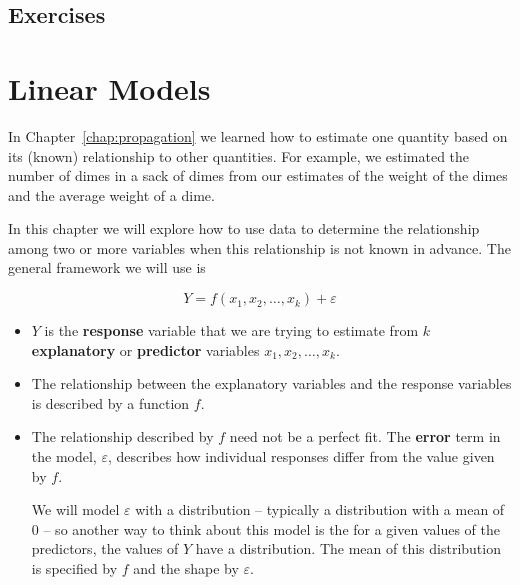 \documentclass[twoside]{book}\usepackage[]{graphicx}\usepackage[]{xcolor}
\def\term#1{\textbf{#1}}
\newcounter{example}[section]
\newif\ifsolutions
\newif\ifsolutionslocal
\begin{document}
\newpage
\section{Exercises}
\shipoutProblems

\ifsolutions
\ifsolutionslocal
\newpage
\section*{Solutions}
\shipoutSolutions
\fi
\fi






\setcounter{chapter}{6}

\chapter{Linear Models}

In Chapter~\ref{chap:propagation} we learned how to estimate one quantity based
on its (known) relationship to other quantities.  For example, we estimated the
number of dimes in a sack of dimes from our estimates of the weight of the
dimes and the average weight of a dime.  

In this chapter we will explore how to use data to determine the relationship among
two or more variables when this relationship is not known in advance.  The general
framework we will use is 

\[
Y = f(x_1, x_2, \dots, x_k) + \varepsilon
\]
\begin{itemize}
	\item $Y$ is the \term{response} variable that we are trying to estimate
		from $k$ \term{explanatory} or \term{predictor} variables $x_1, x_2, \dots, x_k$.
	\item
		The relationship between the explanatory variables and the response 
		variables is described by a function $f$.
	\item
		The relationship described by $f$ need not be a perfect fit.  The \term{error}
		term in the model, $\varepsilon$, describes how individual responses
		differ from the value given by $f$.  
		
		We will model $\varepsilon$ with a 
		distribution -- typically a distribution with a mean of 0 -- 
		so another way to think about this model is the for a given 
		values of the predictors, the values of $Y$ have a distribution.  The mean
		of this distribution is specified by $f$ and the shape by $\varepsilon$.
\end{itemize}
\end{document}
